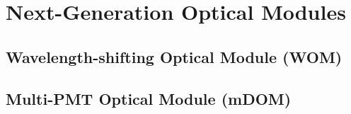 \section{Next-Generation Optical Modules}
\label{sec:EvtReco}

\subsection{Wavelength-shifting Optical Module (WOM)}


\subsection{Multi-PMT Optical Module (mDOM)}